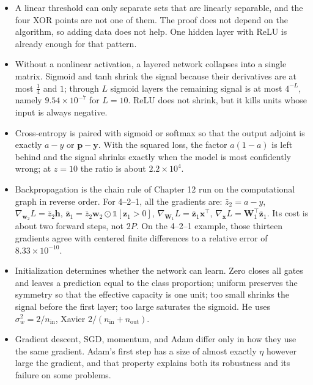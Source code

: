 \begin{ringkasan}
\begin{itemize}
  \item A linear threshold can only separate sets that are linearly separable, and the four XOR
        points are not one of them. The proof does not depend on the algorithm, so adding data
        does not help. One hidden layer with ReLU is already enough for that pattern.
  \item Without a nonlinear activation, a layered network collapses into a single matrix. Sigmoid
        and tanh shrink the signal because their derivatives are at most $\tfrac14$ and $1$;
        through $L$ sigmoid layers the remaining signal is at most $4^{-L}$, namely
        $9.54\times10^{-7}$ for $L=10$. ReLU does not shrink, but it kills units whose input is
        always negative.
  \item Cross-entropy is paired with sigmoid or softmax so that the output adjoint is exactly
        $a-y$ or $\mathbf{p}-\mathbf{y}$. With the squared loss, the factor $a(1-a)$ is left
        behind and the signal shrinks exactly when the model is most confidently wrong; at $z=10$
        the ratio is about $2.2\times10^{4}$.
  \item Backpropagation is the chain rule of Chapter 12 run on the computational graph in reverse
        order. For 4--2--1, all the gradients are:
        $\bar{z}_{2}=a-y$, $\nabla_{\mathbf{w}_{2}}L=\bar{z}_{2}\mathbf{h}$,
        $\bar{\mathbf{z}}_{1}=\bar{z}_{2}\mathbf{w}_{2}\odot\mathbb{1}[\mathbf{z}_{1}>0]$,
        $\nabla_{\mathbf{W}_{1}}L=\bar{\mathbf{z}}_{1}\mathbf{x}^{\top}$,
        $\nabla_{\mathbf{x}}L=\mathbf{W}_{1}^{\top}\bar{\mathbf{z}}_{1}$. Its cost is about two
        forward steps, not $2P$. On the 4--2--1 example, those thirteen gradients agree with
        centered finite differences to a relative error of $8.33\times10^{-10}$.
  \item Initialization determines whether the network can learn. Zero closes all gates and leaves
        a prediction equal to the class proportion; uniform preserves the symmetry so that the
        effective capacity is one unit; too small shrinks the signal before the first layer; too
        large saturates the sigmoid. He uses $\sigma_{w}^{2}=2/n_{\mathrm{in}}$, Xavier
        $2/(n_{\mathrm{in}}+n_{\mathrm{out}})$.
  \item Gradient descent, SGD, momentum, and Adam differ only in how they use the same gradient.
        Adam's first step has a size of almost exactly $\eta$ however large the gradient, and that
        property explains both its robustness and its failure on some problems.
  
\end{itemize}
\end{ringkasan}

